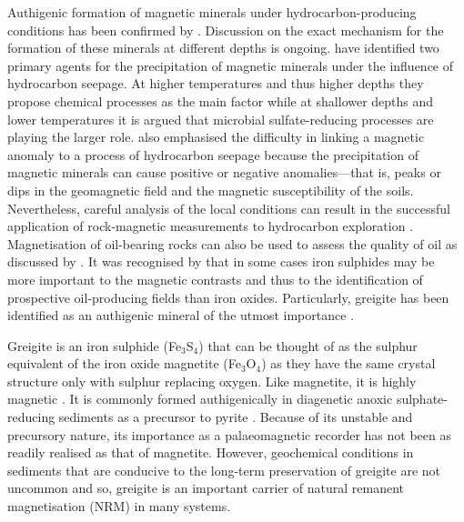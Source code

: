 Authigenic formation of magnetic minerals under hydrocarbon-producing conditions has been confirmed by \citet{Abubakar2015}. Discussion on the exact mechanism for the formation of these minerals at different depths is ongoing. \citet{Machel1991} have identified two primary agents for the precipitation of magnetic minerals under the influence of hydrocarbon seepage. At higher temperatures and thus higher depths they propose chemical processes as the main factor while at shallower depths and lower temperatures it is argued that microbial sulfate-reducing processes are playing the larger role. \citet{Machel1991} also emphasised the difficulty in linking a magnetic anomaly to a process of hydrocarbon seepage because the precipitation of magnetic minerals can cause positive or negative anomalies---that is, peaks or dips in the geomagnetic field and the magnetic susceptibility of the soils. Nevertheless, careful analysis of the local conditions can result in the successful application of rock-magnetic measurements to hydrocarbon exploration \citep{Donovan1984,Liu2006,Emmerton2013B}. Magnetisation of oil-bearing rocks can also be used to assess the quality of oil as discussed by \citet{Emmerton2013}. It was recognised by \citet{Reynolds1993} that in some cases iron sulphides may be more important to the magnetic contrasts and thus to the identification of prospective oil-producing fields than iron oxides. Particularly, greigite has been identified as an authigenic mineral of the utmost importance \citep{Reynolds1993}.\par

Greigite is an iron sulphide (Fe$_3$S$_4$) that can be thought of as the sulphur equivalent of the iron oxide magnetite (Fe$_3$O$_4$) as they have the same crystal structure only with sulphur replacing oxygen. Like magnetite, it is highly magnetic \citep{Li2014}. It is commonly formed authigenically in diagenetic anoxic sulphate-reducing sediments \citep{Roberts2011} as a precursor to pyrite \citep{Berner1984,Hunger2007}. Because of its unstable and precursory nature, its importance as a palaeomagnetic recorder has not been as readily realised as that of magnetite. However, geochemical conditions in sediments that are conducive to the long-term preservation of greigite are not uncommon \citep{Roberts2011,Roberts2015} and so, greigite is an important carrier of natural remanent magnetisation (NRM) in many systems.\par

